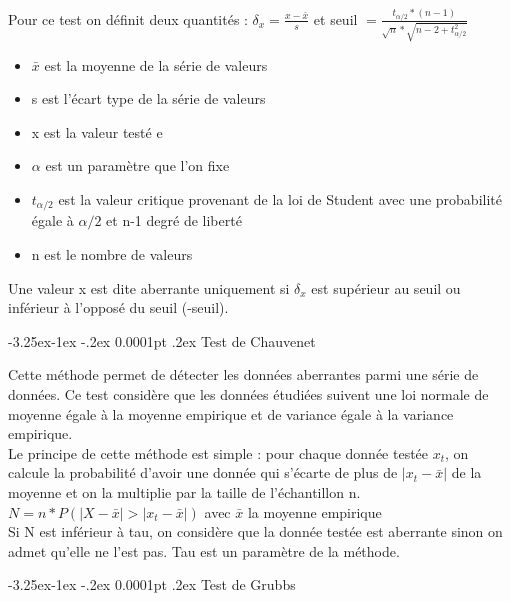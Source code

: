 \documentclass[a4paper,12pt]{article} %
\makeatletter
\renewcommand\paragraph{\@startsection{paragraph}{4}{\z@}%
                                      {-3.25ex\@plus -1ex \@minus -.2ex}%
                                      {0.0001pt \@plus .2ex}%
                                      {\normalfont\normalsize\bfseries}}
\makeatother
\begin{document}
                        
                        Pour ce test on définit deux quantités : $\delta_x=\frac{x-\bar{x}}{s}$ et seuil $=\frac{t_{\alpha/2}*(n-1)}{\sqrt{n}*\sqrt{n-2+t^2_{\alpha/2}}}$
                        \begin{itemize}
                        \item $\bar{x}$ est la moyenne de la série de valeurs
                        \item 	s est l'écart type de la série de valeurs
                        \item 	x est la valeur testé e
                        \item $\alpha$ est un paramètre que l'on fixe
                        \item $t_{\alpha/2}$ est la valeur critique provenant de la loi de Student avec une probabilité égale à  $\alpha/2$ et n-1 degré de liberté 
                        \item n est le nombre de valeurs 
                        \end{itemize}
                        Une valeur x est dite aberrante uniquement si $\delta_x$ est supérieur au seuil ou inférieur à l'opposé du seuil (-seuil).

					\paragraph{Test de Chauvenet}
                        					
                        Cette méthode permet de détecter les données aberrantes parmi une série de données. Ce test  considère que les données étudiées suivent une loi normale de moyenne égale à la moyenne empirique et de variance égale à la variance empirique.\\
                        
                        Le principe de cette méthode est simple : pour chaque donnée testée $x_t$, on calcule la probabilité d'avoir une donnée qui s'écarte de plus de $|x_t-\bar{x}|$ de la moyenne et on la multiplie par la taille de l'échantillon n.\\
                        	$N = n*P( |X-\bar{x}|>|x_t-\bar{x}|)$ avec $\bar{x}$ la moyenne empirique\\
                        	Si N est inférieur à tau, on considère que la donnée testée est aberrante sinon on admet qu'elle ne l'est pas. Tau est un paramètre de la méthode. 
                    					   
					\paragraph{Test de Grubbs}
                        					
\end{document}
